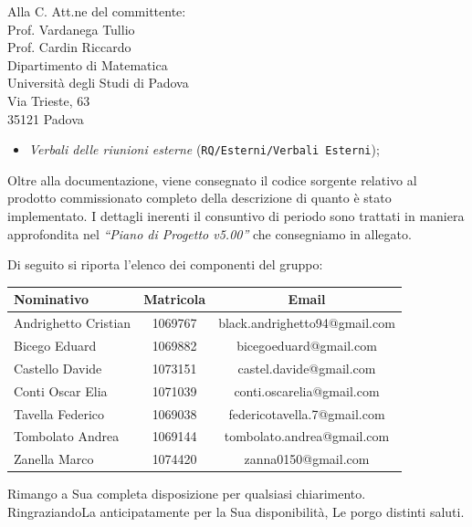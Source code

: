 \documentclass[a4paper,12pt]{letteracdp}
\begin{document}
\begin{letter}{
		Alla C. Att.ne del committente: \\
		Prof. Vardanega Tullio \\
		Prof. Cardin Riccardo \\
		Dipartimento di Matematica \\
		Università degli Studi di Padova \\
		Via Trieste, 63 \\
		35121 Padova}
\begin{itemize}
	\item \textit{Verbali delle riunioni esterne}	(\texttt{RQ/Esterni/Verbali Esterni});
		
\end{itemize}

Oltre alla documentazione, viene consegnato il codice sorgente relativo al prodotto commissionato completo della descrizione di quanto è stato implementato. I dettagli inerenti il consuntivo di periodo sono trattati in maniera approfondita nel \textit{``Piano di Progetto v5.00''} che consegniamo in allegato.

\newpage
Di seguito si riporta l'elenco dei componenti del gruppo:

\begin{center}
		\begin{tabular}{l c c}
			\toprule
			\textbf{Nominativo} & \textbf{Matricola} & \textbf{Email} \\
			\midrule
			Andrighetto Cristian & 1069767 & black.andrighetto94@gmail.com \\
			Bicego Eduard & 1069882 & bicegoeduard@gmail.com  \\
			Castello Davide	& 1073151 &	 castel.davide@gmail.com\\
			Conti Oscar Elia & 1071039 & conti.oscarelia@gmail.com \\
			Tavella Federico & 1069038 & federicotavella.7@gmail.com\\
			Tombolato Andrea & 1069144 & tombolato.andrea@gmail.com	 \\
			Zanella Marco & 1074420 & zanna0150@gmail.com \\
			\bottomrule
		\end{tabular}
\end{center}
		
		\closing{Rimango a Sua completa disposizione per qualsiasi chiarimento. \\
		RingraziandoLa anticipatamente per la Sua disponibilità, Le porgo distinti saluti.}
		
	\end{letter}
\end{document}
